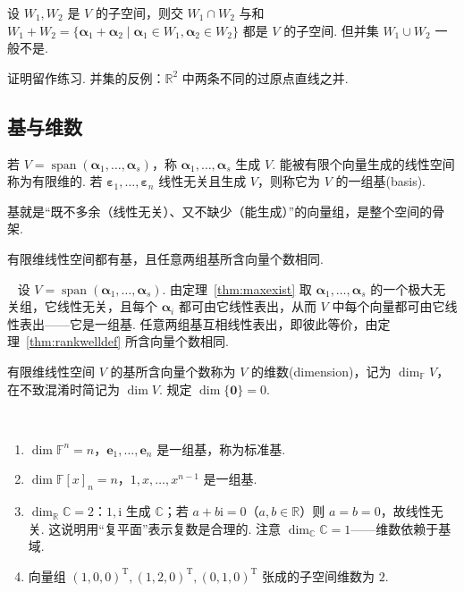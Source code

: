 \documentclass[lang=cn,10.5pt,scheme=chinese,toc=twocol,section,chinesefont=nofont,
twoside,citestyle=gb7714-2015,bibstyle=gb7714-2015]{elegantbook}
\DeclareRobustCommand{\textbf}[1]{{\lnsemiboldlatin\lnsemiboldcjk #1}}
\newcommand{\vv}[1]{\boldsymbol{#1}}
\newcommand{\zero}{\boldsymbol{0}}          %
\newcommand{\trans}{\mathrm{T}}             %
\numberwithin{equation}{section}   %
\newcommand{\spn}{\operatorname{span}}      %
\newcommand*{\lnlabel}[1]{{\sffamily\bfseries\color{black}#1}}
\renewenvironment{example}[1][]{%
	\refstepcounter{exam}%
	\par\noindent\lnlabel{\examplename\ \theexam\ifblank{#1}{}{\ #1}}\ \rmfamily}{%
	\par\ignorespacesafterend}
\renewenvironment{proof}{%
	\par\noindent\lnlabel{\proofname}\;\ \color{black!90}\cfs}{\par}
\begin{document}
\begin{proposition}
  设 $W_1,W_2$ 是 $V$ 的子空间，则交 $W_1\cap W_2$ 与和 $W_1+W_2=\{\vv\alpha_1+\vv\alpha_2\mid \vv\alpha_1\in W_1,\vv\alpha_2\in W_2\}$ 都是 $V$ 的子空间. 但并集 $W_1\cup W_2$ 一般不是.
\end{proposition}

证明留作练习. 并集的反例：$\mathbb{R}^2$ 中两条不同的过原点直线之并.

\subsection{基与维数}

\begin{definition}
  若 $V=\spn(\vv\alpha_1,\ldots,\vv\alpha_s)$，称 $\vv\alpha_1,\ldots,\vv\alpha_s$ \textbf{生成} $V$. 能被有限个向量生成的线性空间称为\textbf{有限维}的. 若 $\vv\varepsilon_1,\ldots,\vv\varepsilon_n$ 线性无关且生成 $V$，则称它为 $V$ 的一组\textbf{基}(basis).
\end{definition}

基就是“既不多余（线性无关）、又不缺少（能生成）”的向量组，是整个空间的骨架.

\begin{theorem}
  有限维线性空间都有基，且任意两组基所含向量个数相同.
\end{theorem}
\begin{proof}
  设 $V=\spn(\vv\alpha_1,\ldots,\vv\alpha_s)$. 由定理~\ref{thm:maxexist} 取 $\vv\alpha_1,\ldots,\vv\alpha_s$ 的一个极大无关组，它线性无关，且每个 $\vv\alpha_i$ 都可由它线性表出，从而 $V$ 中每个向量都可由它线性表出——它是一组基. 任意两组基互相线性表出，即彼此等价，由定理~\ref{thm:rankwelldef} 所含向量个数相同.
\end{proof}

\begin{definition}
  有限维线性空间 $V$ 的基所含向量个数称为 $V$ 的\textbf{维数}(dimension)，记为 $\dim_{\mathbb{F}} V$，在不致混淆时简记为 $\dim V$. 规定 $\dim\{\zero\}=0$.
\end{definition}

\begin{example}
  \begin{enumerate}
    \item $\dim\mathbb{F}^n=n$，$\vv e_1,\ldots,\vv e_n$ 是一组基，称为\textbf{标准基}.
    \item $\dim\mathbb{F}[x]_n=n$，$1,x,\ldots,x^{n-1}$ 是一组基.
    \item $\dim_{\mathbb{R}}\mathbb{C}=2$：$1,\mathrm{i}$ 生成 $\mathbb{C}$；若 $a+b\mathrm{i}=0$（$a,b\in\mathbb{R}$）则 $a=b=0$，故线性无关. 这说明用“复平面”表示复数是合理的. 注意 $\dim_{\mathbb{C}}\mathbb{C}=1$——维数依赖于基域.
    \item 向量组 $(1,0,0)^\trans,(1,2,0)^\trans,(0,1,0)^\trans$ 张成的子空间维数为 $2$.
  \end{enumerate}
\end{example}
\end{document}
